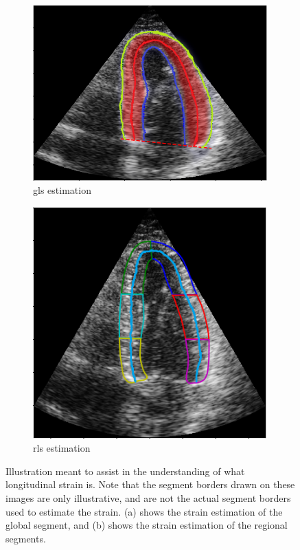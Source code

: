 \begin{figure}[H]
    \centering
    \begin{subfigure}[b]{0.49\textwidth} 
        \includegraphics[width=0.99\textwidth]{echocardiography/gls_estimation.png}
        \caption{\acrshort{gls} estimation}
        \label{fig:gls_estimation}
    \end{subfigure}
    \begin{subfigure}[b]{0.49\textwidth}
        \includegraphics[width=0.99\textwidth]{echocardiography/rls_estimation.png}
        \caption{\acrshort{rls} estimation}
        \label{fig:rls_estimation}
    \end{subfigure}
    \caption{Illustration meant to assist in the understanding of what longitudinal strain is. Note that the segment borders drawn on these images are only illustrative, and are not the actual segment borders used to estimate the strain. (a) shows the strain estimation of the global segment, and (b) shows the strain estimation of the regional segments.}
    \label{fig:strain_estimation}
\end{figure}

